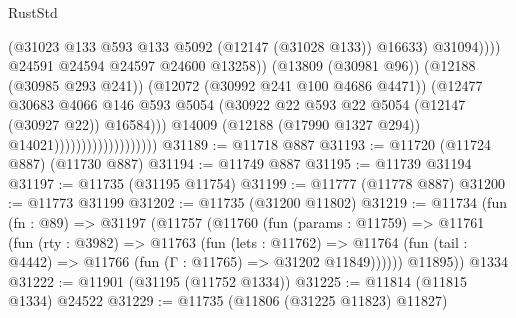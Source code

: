 \begin{lexlean}{RustStd}
\begin{coremodule}
                                                        (@31023
                                                          @133
                                                          @593
                                                          @133
                                                          @5092
                                                          (@12147 (@31028 @133))
                                                          @16633)
                                                        @31094))))
                                                @24591
                                                @24594
                                                @24597
                                                @24600
                                                @13258))
                                            (@13809 (@30981 @96))
                                            (@12188 (@30985 @293 @241))
                                            (@12072 (@30992 @241 @100 @4686 @4471))
                                            (@12477
                                              @30683
                                              @4066
                                              @146
                                              @593
                                              @5054
                                              (@30922
                                                @22
                                                @593
                                                @22
                                                @5054
                                                (@12147 (@30927 @22))
                                                @16584)))
                                          @14009
                                          (@12188 (@17990 @1327 @294))
                                          @14021)))))))))))))))))))
@31189 := @11718 @887
@31193 := @11720 (@11724 @887) (@11730 @887)
@31194 := @11749 @887
@31195 := @11739 @31194
@31197 := @11735 (@31195 @11754)
@31199 := @11777 (@11778 @887)
@31200 := @11773 @31199
@31202 := @11735 (@31200 @11802)
@31219 := @11734
    (fun (fn : @89) =>
    @31197
      (@11757
        (@11760
          (fun (params : @11759) =>
          @11761
            (fun (rty : @3982) =>
            @11763
              (fun (lets : @11762) =>
              @11764 (fun (tail : @4442) => @11766 (fun (Γ : @11765) => @31202 @11849))))))
        @11895))
    @1334
@31222 := @11901 (@31195 (@11752 @1334))
@31225 := @11814 (@11815 @1334) @24522
@31229 := @11735 (@11806 (@31225 @11823) @11827)

\end{coremodule}
\end{lexlean}
